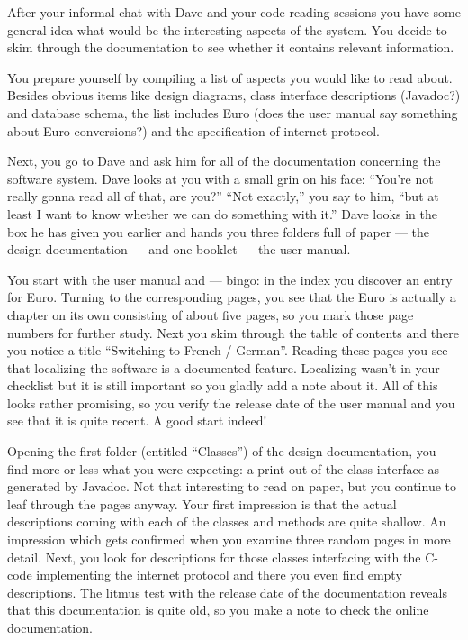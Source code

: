 \documentclass[a4paper,10pt,twoside]{book}
\begin{document}
After your informal chat with Dave and your code reading sessions you have some general idea what would be the interesting aspects of the system. You decide to skim through the documentation to see whether it contains relevant information.

You prepare yourself by compiling a list of aspects you would like to read about. Besides obvious items like design diagrams, class interface descriptions (Javadoc?) and database schema, the list includes Euro (does the user manual say something about Euro conversions?) and the specification of internet protocol.

Next, you go to Dave and ask him for all of the documentation concerning the software system. Dave looks at you with a small grin on his face: ``You're not really gonna read all of that, are you?'' ``Not exactly,'' you say to him, ``but at least I want to know whether we can do something with it.'' Dave looks in the box he has given you earlier and hands you three folders full of paper --- the design documentation --- and one booklet --- the user manual.

You start with the user manual and --- bingo: in the index you discover an entry for Euro. Turning to the corresponding pages, you see that the Euro is actually a chapter on its own consisting of about five pages, so you mark those page numbers for further study. Next you skim through the table of contents and there you notice a title ``Switching to French / German''. Reading these pages you see that localizing the software is a documented feature. Localizing wasn't in your checklist but it is still important so you gladly add a note about it. All of this looks rather promising, so you verify the release date of the user manual and you see that it is quite recent. A good start indeed!

Opening the first folder (entitled ``Classes'') of the design documentation, you find more or less what you were expecting: a print-out of the class interface as generated by Javadoc. Not that interesting to read on paper, but you continue to leaf through the pages anyway. Your first impression is that the actual descriptions coming with each of the classes and methods are quite shallow. An impression which gets confirmed when you examine three random pages in more detail. Next, you look for descriptions for those classes interfacing with the C-code implementing the internet protocol and there you even find empty descriptions. The litmus test with the release date of the documentation reveals that this documentation is quite old, so you make a note to check the online documentation.
\end{document}
